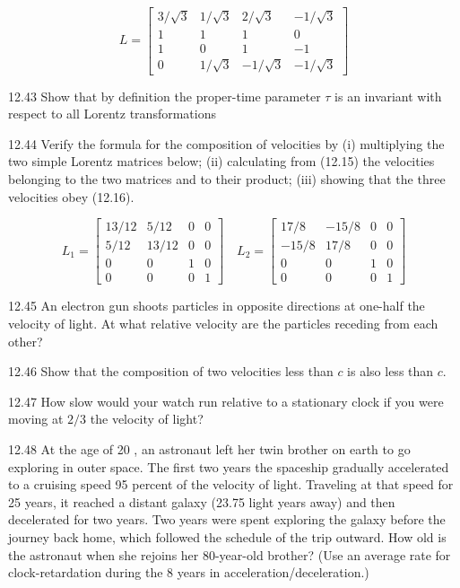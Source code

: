 \documentclass[10pt]{article}
\begin{document}
$$
L=\left[\begin{array}{cccc}
3 / \sqrt{3} & 1 / \sqrt{3} & 2 / \sqrt{3} & -1 / \sqrt{3} \\
1 & 1 & 1 & 0 \\
1 & 0 & 1 & -1 \\
0 & 1 / \sqrt{3} & -1 / \sqrt{3} & -1 / \sqrt{3}
\end{array}\right]
$$

12.43 Show that by definition the proper-time parameter $\tau$ is an invariant with respect to all Lorentz transformations

12.44 Verify the formula for the composition of velocities by (i) multiplying the two simple Lorentz matrices below; (ii) calculating from (12.15) the velocities belonging to the two matrices and to their product; (iii) showing that the three velocities obey (12.16).

$$
L_{1}=\left[\begin{array}{cccc}
13 / 12 & 5 / 12 & 0 & 0 \\
5 / 12 & 13 / 12 & 0 & 0 \\
0 & 0 & 1 & 0 \\
0 & 0 & 0 & 1
\end{array}\right] \quad L_{2}=\left[\begin{array}{cccc}
17 / 8 & -15 / 8 & 0 & 0 \\
-15 / 8 & 17 / 8 & 0 & 0 \\
0 & 0 & 1 & 0 \\
0 & 0 & 0 & 1
\end{array}\right]
$$

12.45 An electron gun shoots particles in opposite directions at one-half the velocity of light. At what relative velocity are the particles receding from each other?

12.46 Show that the composition of two velocities less than $c$ is also less than $c$.

12.47 How slow would your watch run relative to a stationary clock if you were moving at $2 / 3$ the velocity of light?

12.48 At the age of 20 , an astronaut left her twin brother on earth to go exploring in outer space. The first two years the spaceship gradually accelerated to a cruising speed 95 percent of the velocity of light. Traveling at that speed for 25 years, it reached a distant galaxy (23.75 light years away) and then decelerated for two years. Two years were spent exploring the galaxy before the journey back home, which followed the schedule of the trip outward. How old is the astronaut when she rejoins her 80-year-old brother? (Use an average rate for clock-retardation during the 8 years in acceleration/deceleration.)
\end{document}
